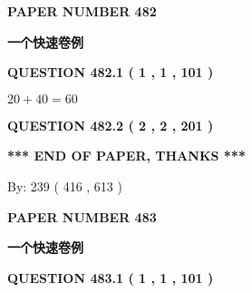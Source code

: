 \documentclass{ctexart}
\begin{document}
   
 {\textbf{ \Large{ PAPER NUMBER  482  }}}
   
   
\vspace{0.2in}
   
   
   
   
   
   
 \vspace{0.2in}
{\LARGE {\textbf{ 一个快速卷例}}}
   
   
  
\vspace{0.2in}
  
{\textbf{\Large{QUESTION
482.1 
 ( 1 , 1 , 101 )
}}}
  
  
 
 

$ %
20 +  %
40=   %
60$
 
 
  
\vspace{0.2in}
  
{\textbf{\Large{QUESTION
482.2 
 ( 2 , 2 , 201 )
}}}
  
  
   
   
 \vspace{0.2in}
 
   
   
   
   
\vspace{1.0in} 
{\textbf{\large{ *** END OF PAPER, THANKS *** }}} 
   
   
\hspace{1.0in} By: 
 239 ( 416 ,  613 )
   
   
   
   
\newpage 
\setcounter{page}{ 
   483001 } 
   
   
   
   
 {\textbf{ \Large{ PAPER NUMBER  483  }}}
   
   
\vspace{0.2in}
   
   
   
   
   
   
 \vspace{0.2in}
{\LARGE {\textbf{ 一个快速卷例}}}
   
   
  
\vspace{0.2in}
  
{\textbf{\Large{QUESTION
483.1 
 ( 1 , 1 , 101 )
}}}
  
\end{document}
